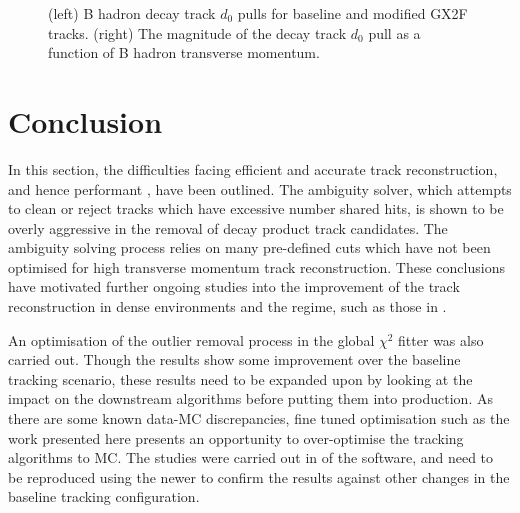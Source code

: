 \begin{figure}[!htbp]
\begin{subfigure}{.48\textwidth}
    \end{subfigure}
    \caption{(left) B hadron decay track $d_0$ pulls for baseline and modified GX2F tracks. (right) The magnitude of the decay track $d_0$ pull as a function of B hadron transverse momentum.}
    \label{fig:gx2f_opt_pulls}
\end{figure}




\section{Conclusion}

In this section, the difficulties facing efficient and accurate  track reconstruction, and hence performant \btagging, have been outlined.
The ambiguity solver, which attempts to clean or reject tracks which have excessive number shared hits, is shown to be overly aggressive in the removal of \bhadron decay product track candidates.
The ambiguity solving process relies on many pre-defined cuts which have not been optimised for high transverse momentum \bhadron track reconstruction.
These conclusions have motivated further ongoing studies into the improvement of the track reconstruction in dense environments and the \highpt regime, such as those in .

An optimisation of the outlier removal process in the global $\chi^2$ fitter was also carried out.
Though the results show some improvement over the baseline tracking scenario, these results need to be expanded upon by looking at the impact on the downstream \btagging algorithms before putting them into production.
As there are some known data-MC discrepancies, fine tuned optimisation such as the work presented here presents an opportunity to over-optimise the tracking algorithms to MC.
The studies were carried out in \rtwoone of the \ATLAS software, and need to be reproduced using the newer \rtwotwo to confirm the results against other changes in the baseline tracking configuration.
